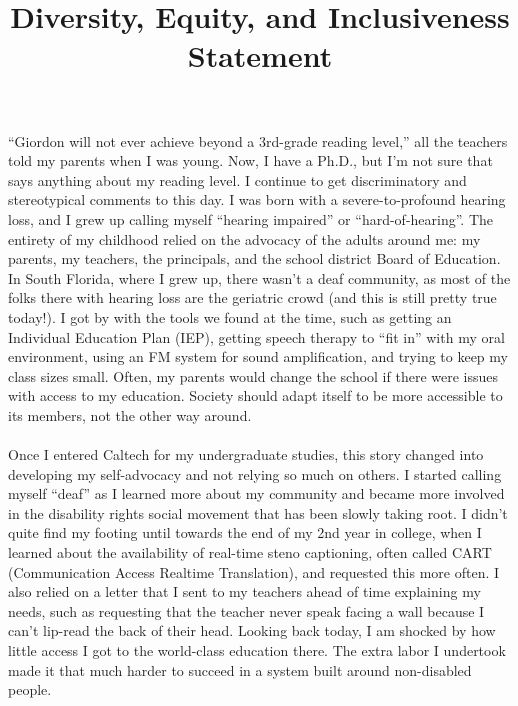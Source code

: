 \documentclass[10pt,a4paper,sans]{moderncv} %
\title{Diversity, Equity, and Inclusiveness Statement}
\begin{document}
\renewcommand*{\bibliographyhead}[1]{\section{#1}}
\makecvtitle %
\vspace*{-2em}

``Giordon will not ever achieve beyond a 3rd-grade reading level,'' all the teachers told my parents when I was young. Now, I have a Ph.D., but I'm not sure that says anything about my reading level. I continue to get discriminatory and stereotypical comments to this day. I was born with a severe-to-profound hearing loss, and I grew up calling myself ``hearing impaired'' or ``hard-of-hearing''. The entirety of my childhood relied on the advocacy of the adults around me: my parents, my teachers, the principals, and the school district Board of Education. In South Florida, where I grew up, there wasn't a deaf community, as most of the folks there with hearing loss are the geriatric crowd (and this is still pretty true today!). I got by with the tools we found at the time, such as getting an Individual Education Plan (IEP), getting speech therapy to ``fit in'' with my oral environment, using an FM system for sound amplification, and trying to keep my class sizes small. Often, my parents would change the school if there were issues with access to my education. Society should adapt itself to be more accessible to its members, not the other way around.
\\
\\
Once I entered Caltech for my undergraduate studies, this story changed into developing my self-advocacy and not relying so much on others. I started calling myself ``deaf'' as I learned more about my community and became more involved in the disability rights social movement that has been slowly taking root. I didn't quite find my footing until towards the end of my 2nd year in college, when I learned about the availability of real-time steno captioning, often called CART (Communication Access Realtime Translation), and requested this more often. I also relied on a letter that I sent to my teachers ahead of time explaining my needs, such as requesting that the teacher never speak facing a wall because I can't lip-read the back of their head. Looking back today, I am shocked by how little access I got to the world-class education there. The extra labor I undertook made it that much harder to succeed in a system built around non-disabled people.
\\
\end{document}
